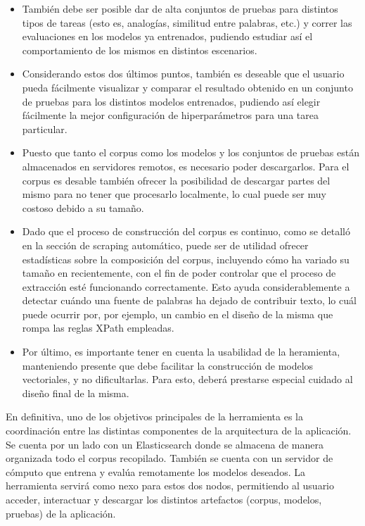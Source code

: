 \begin{itemize}
\item También debe ser posible dar de alta conjuntos de pruebas para distintos tipos de tareas (esto
es, analogías, similitud entre palabras, etc.) y correr las evaluaciones en los modelos ya
entrenados, pudiendo estudiar así el comportamiento de los mismos en distintos escenarios.

\item Considerando estos dos últimos puntos, también es deseable que el usuario pueda fácilmente
visualizar y comparar el resultado obtenido en un conjunto de pruebas para los distintos modelos
entrenados, pudiendo así elegir fácilmente la mejor configuración de hiperparámetros para una tarea
particular.

\item Puesto que tanto el corpus como los modelos y los conjuntos de pruebas están almacenados en
servidores remotos, es necesario poder descargarlos. Para el corpus es desable también ofrecer la
posibilidad de descargar partes del mismo para no tener que procesarlo localmente, lo cual puede ser
muy costoso debido a su tamaño.

\item Dado que el proceso de construcción del corpus es continuo, como se detalló en la sección de
scraping automático, puede ser de utilidad ofrecer estadísticas sobre la composición del corpus,
incluyendo cómo ha variado su tamaño en recientemente, con el fin de poder controlar que el proceso
de extracción esté funcionando correctamente. Esto ayuda considerablemente a detectar cuándo una
fuente de palabras ha dejado de contribuir texto, lo cuál puede ocurrir por, por ejemplo, un cambio
en el diseño de la misma que rompa las reglas XPath empleadas.

\item Por último, es importante tener en cuenta la usabilidad de la heramienta, manteniendo presente
que debe facilitar la construcción de modelos vectoriales, y no dificultarlas. Para esto, deberá
prestarse especial cuidado al diseño final de la misma.

\end{itemize}

En definitiva, uno de los objetivos principales de la herramienta es la coordinación entre las
distintas componentes de la arquitectura de la aplicación. Se cuenta por un lado con un
Elasticsearch donde se almacena de manera organizada todo el corpus recopilado. También se cuenta
con un servidor de cómputo que entrena y evalúa remotamente los modelos deseados. La herramienta
servirá como nexo para estos dos nodos, permitiendo al usuario acceder, interactuar y descargar los
distintos artefactos (corpus, modelos, pruebas) de la aplicación.


